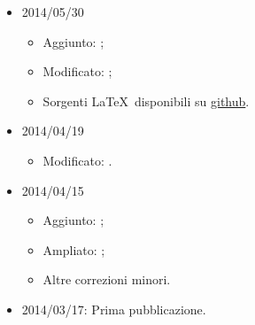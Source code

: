 \begin{itemize}
    
    \item 2014/05/30
    \begin{itemize}
    \item Aggiunto: ;
    \item Modificato: ;
    \item Sorgenti \LaTeX~disponibili su \href{https://github.com/dimatteomaurizio/appunti-machine-learning}{github}.
    \end{itemize}

     \item 2014/04/19
     \begin{itemize}
     \item Modificato: .
     \end{itemize}
     
    
    \item 2014/04/15 \begin{itemize}
        \item Aggiunto: ;
        \item Ampliato: ;
        \item Altre correzioni minori.
     \end{itemize}
     
     \item 2014/03/17: Prima pubblicazione.
    
\end{itemize}

